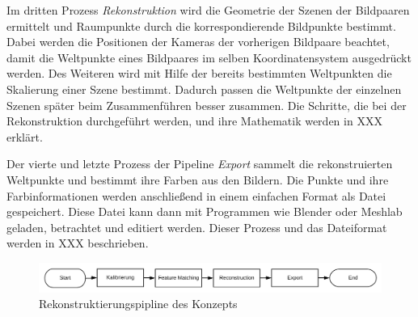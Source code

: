 Im dritten Prozess \emph{Rekonstruktion} wird die Geometrie der Szenen der Bildpaaren ermittelt und Raumpunkte durch die korrespondierende Bildpunkte bestimmt.
Dabei werden die Positionen der Kameras der vorherigen Bildpaare beachtet, damit die Weltpunkte eines Bildpaares im selben Koordinatensystem ausgedrückt werden.
Des Weiteren wird mit Hilfe der bereits bestimmten Weltpunkten die Skalierung einer Szene bestimmt.
Dadurch passen die Weltpunkte der einzelnen Szenen später beim Zusammenführen besser zusammen.
Die Schritte, die bei der Rekonstruktion durchgeführt werden, und ihre Mathematik werden in XXX erklärt.

Der vierte und letzte Prozess der Pipeline \emph{Export} sammelt die rekonstruierten Weltpunkte und bestimmt ihre Farben aus den Bildern.
Die Punkte und ihre Farbinformationen werden anschließend in einem einfachen Format als Datei gespeichert.
Diese Datei kann dann mit Programmen wie Blender oder Meshlab geladen, betrachtet und editiert werden.
Dieser Prozess und das Dateiformat werden in XXX beschrieben.


\begin{figure}
    \centering
    \includegraphics{src/img/konzept-pipeline-horizontal.png}
    \caption{Rekonstruktierungspipline des Konzepts}
    \label{fig:concept-pipeline}
\end{figure}

